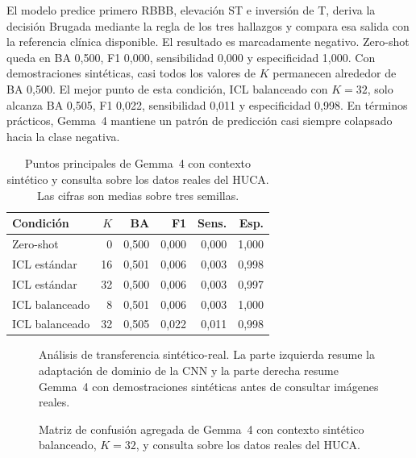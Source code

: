 El modelo predice primero RBBB, elevación ST e inversión de T, deriva la decisión Brugada mediante la regla de los tres hallazgos y compara esa salida con la referencia clínica disponible. El resultado es marcadamente negativo. Zero-shot queda en BA 0,500, F1 0,000, sensibilidad 0,000 y especificidad 1,000. Con demostraciones sintéticas, casi todos los valores de \(K\) permanecen alrededor de BA 0,500. El mejor punto de esta condición, ICL balanceado con \(K=32\), solo alcanza BA 0,505, F1 0,022, sensibilidad 0,011 y especificidad 0,998. En términos prácticos, Gemma~4 mantiene un patrón de predicción casi siempre colapsado hacia la clase negativa.

\begin{table}[H]
  \centering
  \small
  \begin{tabularx}{0.94\textwidth}{p{3.7cm}rrrrr}
    \toprule
    Condición & \(K\) & BA & F1 & Sens. & Esp. \\
    \midrule
    Zero-shot & 0  & 0,500 & 0,000 & 0,000 & 1,000 \\
    ICL estándar & 16 & 0,501 & 0,006 & 0,003 & 0,998 \\
    ICL estándar & 32 & 0,500 & 0,006 & 0,003 & 0,997 \\
    ICL balanceado & 8 & 0,501 & 0,006 & 0,003 & 1,000 \\
    ICL balanceado & 32 & 0,505 & 0,022 & 0,011 & 0,998 \\
    \bottomrule
  \end{tabularx}
  \caption{Puntos principales de Gemma~4 con contexto sintético y consulta sobre los datos reales del HUCA. Las cifras son medias sobre tres semillas.}
  \label{tab:vlm_huca_synthetic_context_key}
\end{table}

\begin{figure}[H]
  \centering
  \caption{Análisis de transferencia sintético-real. La parte izquierda resume la adaptación de dominio de la CNN y la parte derecha resume Gemma~4 con demostraciones sintéticas antes de consultar imágenes reales.}
  \label{fig:transfer_synthetic_real_summary}
\end{figure}

\begin{figure}[H]
  \centering
  \caption{Matriz de confusión agregada de Gemma~4 con contexto sintético balanceado, \(K=32\), y consulta sobre los datos reales del HUCA.}
  \label{fig:vlm_huca_synthetic_context_confusion}
\end{figure}

